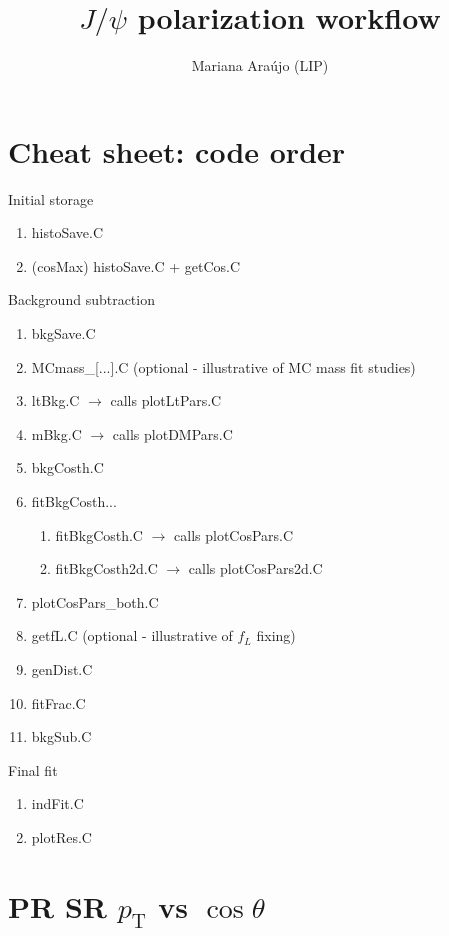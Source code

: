 \documentclass{article}
\newcommand{\pt}{p_\text{T}}
\newcommand{\cost}{\cos\theta}
\begin{document}
\title{$J/\psi$ polarization workflow }
\author{Mariana Ara\'ujo (LIP)}
\maketitle

\tableofcontents

\pagebreak

\section{Cheat sheet: code order}


Initial storage
\begin{enumerate}
\item histoSave.C
\item (cosMax) histoSave.C + getCos.C
\end{enumerate}

Background subtraction
\begin{enumerate}
\item bkgSave.C
\item MCmass\_[...].C (optional - illustrative of MC mass fit studies)
\item ltBkg.C $\rightarrow$ calls plotLtPars.C
\item mBkg.C $\rightarrow$ calls plotDMPars.C
\item bkgCosth.C
\item fitBkgCosth...
\begin{enumerate}
\item fitBkgCosth.C $\rightarrow$ calls plotCosPars.C 
\item fitBkgCosth2d.C $\rightarrow$ calls plotCosPars2d.C
\end{enumerate}
\item plotCosPars\_both.C
\item getfL.C (optional - illustrative of $f_L$ fixing)
\item genDist.C
\item fitFrac.C
\item bkgSub.C
\end{enumerate}

Final fit
\begin{enumerate}
\item indFit.C
\item plotRes.C
\end{enumerate}

\pagebreak

\section{PR SR $\pt$ vs $\cost$}
\end{document}
